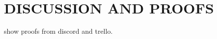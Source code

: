 \chapter{DISCUSSION AND PROOFS}\label{ch:experimental_result}

show proofs from discord and trello.
\clearpage

